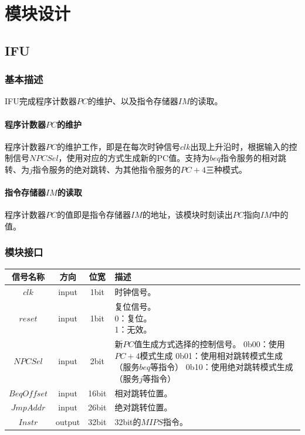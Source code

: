 \documentclass[main.tex]{subfiles}
\begin{document}
\section{模块设计}
\subsection{IFU}
\subsubsection{基本描述}
IFU完成程序计数器$PC$的维护、以及指令存储器$IM$的读取。
\paragraph{程序计数器$PC$的维护}
程序计数器$PC$的维护工作，即是在每次时钟信号$clk$出现上升沿时，根据输入的控制信号$NPCSel$，使用对应的方式生成新的PC值。支持为$beq$指令服务的相对跳转、为$j$指令服务的绝对跳转、为其他指令服务的$PC+4$三种模式。
\paragraph{指令存储器$IM$的读取}
程序计数器$PC$的值即是指令存储器$IM$的地址，该模块时刻读出$PC$指向$IM$中的值。

\subsubsection{模块接口}
\begin{center}
    \begin{tabular}[]{c c c l}
        \toprule
        信号名称 & 方向 & 位宽 & 描述 \\
        \midrule
        $clk$ & input & 1bit & 时钟信号。\\
        $reset$ & input & 1bit & \makecell[lt]{
            复位信号。\\
             0：复位。\\
             1：无效。
        } \\
        $NPCSel$ & input & 2bit & \makecell[lt]{
            新$PC$值生成方式选择的控制信号。\\
            0b00：使用$PC+4$模式生成\\
            0b01：使用相对跳转模式生成（服务$beq$等指令）\\
            0b10：使用绝对跳转模式生成（服务$j$等指令）
        } \\
        \midrule
        $BeqOffset$ & input & 16bit & 相对跳转位置。\\
        $JmpAddr$ & input & 26bit & 绝对跳转位置。 \\
        $Instr$ & output & 32bit & 32bit的$MIPS$指令。\\
        \bottomrule
    \end{tabular}
\end{center}
\end{document}
